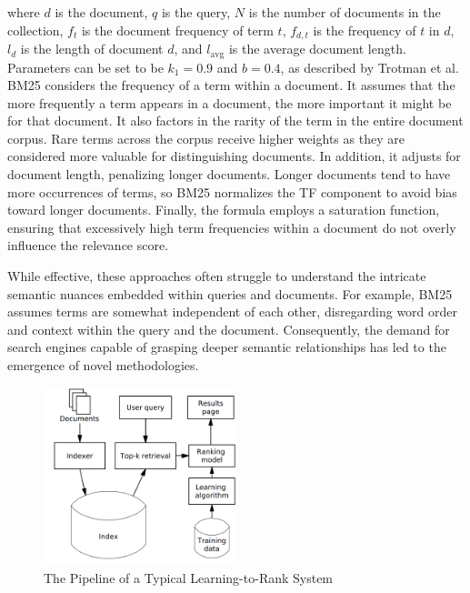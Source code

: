\documentclass[11pt]{article}
\begin{document}
where \(d\) is the document, \(q\) is the query, \(N\) is the number of
documents in the collection, \(f_t\) is the document frequency of term
\(t\), \(f_{d,t}\) is the frequency of \(t\) in \(d\), \(l_d\) is the
length of document \(d\), and \(l_\text{avg}\) is the average document
length. Parameters can be set to be \(k_1 = 0.9\) and \(b = 0.4\), as
described by Trotman et al.\cite{c2} BM25 considers the
frequency of a term within a document. It assumes that the more
frequently a term appears in a document, the more important it might be
for that document. It also factors in the rarity of the term in the
entire document corpus. Rare terms across the corpus receive higher
weights as they are considered more valuable for distinguishing
documents. In addition, it adjusts for document length, penalizing
longer documents. Longer documents tend to have more occurrences of
terms, so BM25 normalizes the TF component to avoid bias toward longer
documents. Finally, the formula employs a saturation function, ensuring
that excessively high term frequencies within a document do not overly
influence the relevance score.

While effective, these approaches often struggle to understand the
intricate semantic nuances embedded within queries and documents. For
example, BM25 assumes terms are somewhat independent of each other,
disregarding word order and context within the query and the document.
Consequently, the demand for search engines capable of grasping deeper
semantic relationships has led to the emergence of novel methodologies.

\begin{figure}[!h]
\centering
\includegraphics[width=0.5\textwidth]{readme.assets/image-20231223172059132.png}
\caption{The Pipeline of a Typical Learning-to-Rank System \cite{c3}}
\label{l2r pipeline}
\end{figure}
\end{document}
